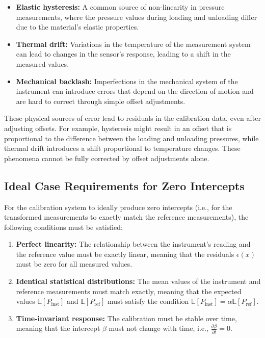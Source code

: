 \documentclass{article}
\begin{document}
\begin{itemize}
	\item \textbf{Elastic hysteresis:} A common source of non-linearity in pressure measurements, where the pressure values during loading and unloading differ due to the material's elastic properties.
	\item \textbf{Thermal drift:} Variations in the temperature of the measurement system can lead to changes in the sensor’s response, leading to a shift in the measured values.
	\item \textbf{Mechanical backlash:} Imperfections in the mechanical system of the instrument can introduce errors that depend on the direction of motion and are hard to correct through simple offset adjustments.
\end{itemize}

These physical sources of error lead to residuals in the calibration data, even after adjusting offsets. For example, hysteresis might result in an offset that is proportional to the difference between the loading and unloading pressures, while thermal drift introduces a shift proportional to temperature changes. These phenomena cannot be fully corrected by offset adjustments alone.

\subsection{Ideal Case Requirements for Zero Intercepts}
For the calibration system to ideally produce zero intercepts (i.e., for the transformed measurements to exactly match the reference measurements), the following conditions must be satisfied:

\begin{enumerate}
	\item \textbf{Perfect linearity:} The relationship between the instrument's reading and the reference value must be exactly linear, meaning that the residuals \( \epsilon(x) \) must be zero for all measured values.
	\item \textbf{Identical statistical distributions:} The mean values of the instrument and reference measurements must match exactly, meaning that the expected values \( \mathbb{E}[P_{\text{inst}}] \) and \( \mathbb{E}[P_{\text{ref}}] \) must satisfy the condition \( \mathbb{E}[P_{\text{inst}}] = \alpha \mathbb{E}[P_{\text{ref}}] \).
	\item \textbf{Time-invariant response:} The calibration must be stable over time, meaning that the intercept \( \beta \) must not change with time, i.e., \( \frac{\partial \beta}{\partial t} = 0 \).
\end{enumerate}
\end{document}
